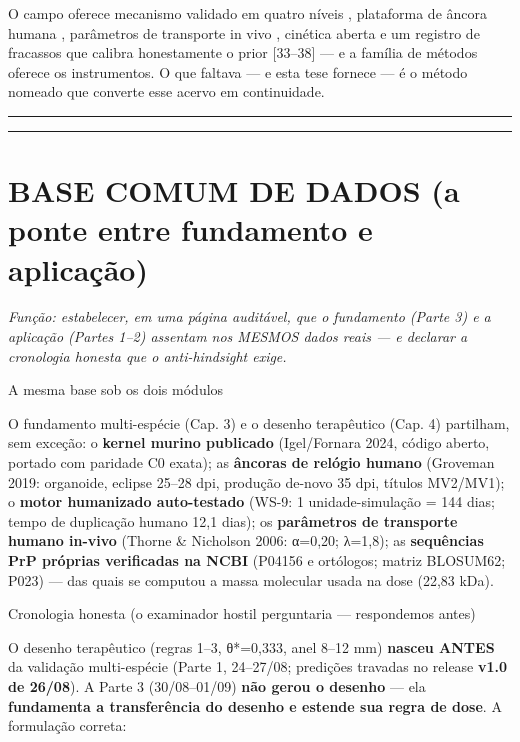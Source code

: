 \documentclass[12pt,a4paper,oneside]{report}
\begin{document}
O campo oferece mecanismo validado em quatro níveis
\cite{e1}\cite{e3}\cite{e4}\cite{e5}, plataforma de âncora humana
\cite{e7}\cite{e8}, parâmetros de transporte in vivo \cite{e10},
cinética aberta \cite{e9} e um registro de fracassos que calibra
honestamente o prior {[}33--38{]} --- e a família de métodos oferece os
instrumentos. O que faltava --- e esta tese fornece --- é o método
nomeado que converte esse acervo em continuidade.

\begin{center}\rule{0.5\linewidth}{0.5pt}\end{center}

\begin{center}\rule{0.5\linewidth}{0.5pt}\end{center}

\hypertarget{base-comum-de-dados-a-ponte-entre-fundamento-e-aplicauxe7uxe3o}{%
\chapter{BASE COMUM DE DADOS (a ponte entre fundamento e
aplicação)}\label{base-comum-de-dados-a-ponte-entre-fundamento-e-aplicauxe7uxe3o}}

\emph{Função: estabelecer, em uma página auditável, que o fundamento
(Parte 3) e a aplicação (Partes 1--2) assentam nos MESMOS dados reais
--- e declarar a cronologia honesta que o anti-hindsight exige.}

A mesma base sob os dois módulos

O fundamento multi-espécie (Cap. 3) e o desenho terapêutico (Cap. 4)
partilham, sem exceção: o \textbf{kernel murino publicado} (Igel/Fornara
2024, código aberto, portado com paridade C0 exata); as \textbf{âncoras
de relógio humano} (Groveman 2019: organoide, eclipse 25--28 dpi,
produção de-novo 35 dpi, títulos MV2/MV1); o \textbf{motor humanizado
auto-testado} (WS-9: 1 unidade-simulação = 144 dias; tempo de duplicação
humano 12,1 dias); os \textbf{parâmetros de transporte humano in-vivo}
(Thorne \& Nicholson 2006: α=0,20; λ=1,8); as \textbf{sequências PrP
próprias verificadas na NCBI} (P04156 e ortólogos; matriz BLOSUM62;
P023) --- das quais se computou a massa molecular usada na dose (22,83
kDa).

Cronologia honesta (o examinador hostil perguntaria --- respondemos
antes)

O desenho terapêutico (regras 1--3, θ*=0,333, anel 8--12 mm)
\textbf{nasceu ANTES} da validação multi-espécie (Parte 1, 24--27/08;
predições travadas no release \textbf{v1.0 de 26/08}). A Parte 3
(30/08--01/09) \textbf{não gerou o desenho} --- ela \textbf{fundamenta a
transferência do desenho e estende sua regra de dose}. A formulação
correta:
\end{document}
